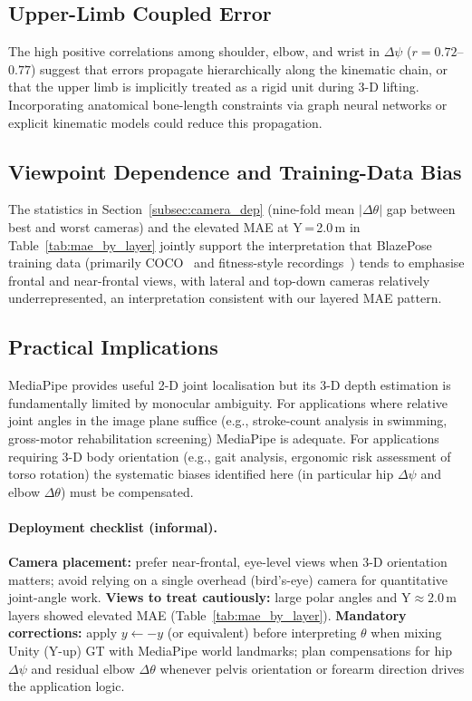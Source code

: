 \documentclass[english,fleqn]{ieej-e}
\begin{document}
\subsection{Upper-Limb Coupled Error}

The high positive correlations among shoulder, elbow, and wrist in
$\Delta\psi$ ($r=0.72$--$0.77$) suggest that errors propagate
hierarchically along the kinematic chain, or that the upper limb is
implicitly treated as a rigid unit during 3-D lifting. Incorporating
anatomical bone-length constraints via graph neural networks or explicit
kinematic models could reduce this propagation.

\subsection{Viewpoint Dependence and Training-Data Bias}

The statistics in Section~\ref{subsec:camera_dep} (nine-fold mean
$|\Delta\theta|$ gap between best and worst cameras) and the elevated MAE at
Y\,=\,2.0\,m in Table~\ref{tab:mae_by_layer} jointly support the interpretation
that BlazePose training data (primarily COCO~\cite{coco} and fitness-style
recordings~\cite{blazepose}) tends to emphasise frontal and near-frontal
views, with lateral and top-down cameras relatively underrepresented, an
interpretation consistent with our layered MAE pattern.

\subsection{Practical Implications}

MediaPipe provides useful 2-D joint localisation but its 3-D depth
estimation is fundamentally limited by monocular ambiguity.
For applications where relative joint angles in the image plane suffice
(e.g., stroke-count analysis in swimming, gross-motor rehabilitation
screening) MediaPipe is adequate. For applications requiring 3-D body
orientation (e.g., gait analysis, ergonomic risk assessment of torso
rotation) the systematic biases identified here (in particular hip
$\Delta\psi$ and elbow $\Delta\theta$) must be compensated.

\paragraph{Deployment checklist (informal).}
\textbf{Camera placement:} prefer near-frontal, eye-level views when
3-D orientation matters; avoid relying on a single overhead (bird's-eye)
camera for quantitative joint-angle work.
\textbf{Views to treat cautiously:} large polar angles and Y$\approx$2.0\,m
layers showed elevated MAE (Table~\ref{tab:mae_by_layer}).
\textbf{Mandatory corrections:} apply $y \leftarrow -y$ (or equivalent)
before interpreting $\theta$ when mixing Unity (Y-up) GT with MediaPipe
world landmarks; plan compensations for hip $\Delta\psi$ and residual
elbow $\Delta\theta$ whenever pelvis orientation or forearm direction
drives the application logic.
\end{document}
